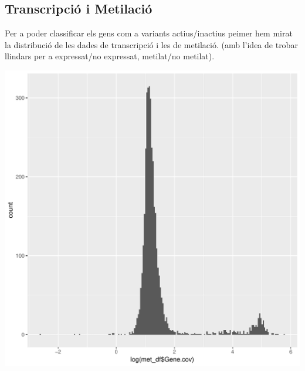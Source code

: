 \documentclass{article}\usepackage[]{graphicx}\usepackage[]{color}
\makeatletter
\newenvironment{kframe}{%
 \def\at@end@of@kframe{}%
 \ifinner\ifhmode%
  \def\at@end@of@kframe{\end{minipage}}%
  \begin{minipage}{\columnwidth}%
 \fi\fi%
 \def\FrameCommand##1{\hskip\@totalleftmargin \hskip-\fboxsep
 \colorbox{shadecolor}{##1}\hskip-\fboxsep
     \hskip-\linewidth \hskip-\@totalleftmargin \hskip\columnwidth}%
 \MakeFramed {\advance\hsize-\width
   \@totalleftmargin\z@ \linewidth\hsize
   \@setminipage}}%
 {\par\unskip\endMakeFramed%
 \at@end@of@kframe}
\newenvironment{knitrout}{}{} %
\makeatother
\begin{document}
\subsection{Transcripció i Metilació}
Per a poder classificar els gens com a variants actius/inactius peimer hem mirat la distribució de les dades de transcripció i les de metilació. (amb l'idea de trobar llindars per a expressat/no expressat, metilat/no metilat).
\begin{knitrout}
\color{fgcolor}\begin{kframe}


{\ttfamily\noindent\bfseries\color{errorcolor}{\#\# Error in ggplot(trans\_df, aes(log(trans\_df\$Aver.2Higher10G.))): object 'trans\_df' not found}}\end{kframe}
\end{knitrout}
\clearpage
\begin{knitrout}
\color{fgcolor}

{\centering \includegraphics[width=1\linewidth]{figure/minimal-met_histo-1} 

}



\end{knitrout}
\clearpage
\end{document}
